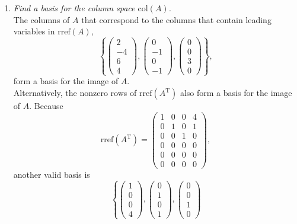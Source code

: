 \documentclass[12pt]{article}
\begin{document}
\begin{enumerate}[label=(\alph*)]
	\item \textit{Find a basis for the column space $\text{col}(A)$.}
	\\[\baselineskip]
	The columns of $A$ that correspond to the columns that contain leading
	variables in $\text{rref}(A)$,
	\begin{equation*}
		\boxed{
			\left\{
				\begin{pmatrix} 2 \\ -4 \\ 6 \\ 4 \end{pmatrix},
				\begin{pmatrix} 0 \\ -1 \\ 0 \\ -1 \end{pmatrix},
				\begin{pmatrix} 0 \\ 0 \\ 3 \\ 0 \end{pmatrix}
			\right\}
		}
		,
	\end{equation*}
	form a basis for the image of $A$. \\[\baselineskip]
	Alternatively, the nonzero rows of $\text{rref}(A^\text{T})$ also form a
	basis for the image of $A$.
	Because
	\begin{equation*}
		\text{rref}(A^\text{T})
		=
		\begin{pmatrix}
			1 & 0 & 0 & 4 \\
			0 & 1 & 0 & 1 \\
			0 & 0 & 1 & 0 \\
			0 & 0 & 0 & 0 \\
			0 & 0 & 0 & 0 \\
			0 & 0 & 0 & 0
		\end{pmatrix}
		,
	\end{equation*}
	another valid basis is
	\begin{equation*}
		\boxed{
			\left\{
				\begin{pmatrix} 1 \\ 0 \\ 0 \\ 4 \end{pmatrix},
				\begin{pmatrix} 0 \\ 1 \\ 0 \\ 1 \end{pmatrix},
				\begin{pmatrix} 0 \\ 0 \\ 1 \\ 0 \end{pmatrix}
}
\end{equation*}
\end{enumerate}
\end{document}
